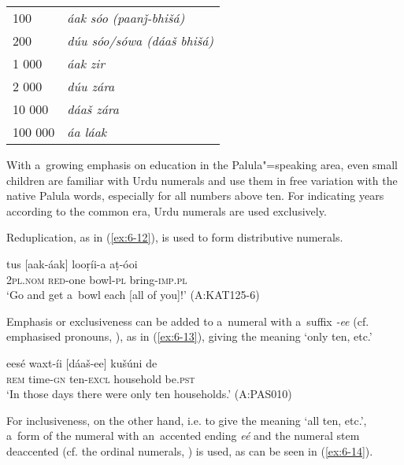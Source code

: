 \begin{table}[H]
\begin{tabularx}{\textwidth}{ l@{\hspace{40pt}} Q }
100 &
\sffamily \textrm{\textit{áak sóo (paanǰ-bhišá)}} \\
200 &
\sffamily \textrm{\textit{dúu sóo/sówa (dáaš bhišá)}}\\
1 000 &
\sffamily \textrm{\textit{áak zir}}\\
2 000 &
\sffamily \textrm{\textit{dúu zára}}\\
10 000 &
\sffamily \textrm{\textit{dáaš zára}}\\
100 000 &
\sffamily \textrm{\textit{áa láak}}\\
\end{tabularx}
\end{table}

With a~growing emphasis on education in the Palula"=speaking area, even small children are familiar
with Urdu numerals and use them in free variation with the native Palula words, especially for all
numbers above ten. For indicating years according to the common era, Urdu numerals are used
exclusively.

Reduplication, as in (\ref{ex:6-12}), is used to form distributive numerals.

\begin{exe}
\ex
\label{ex:6-12}
\gll tus [aak-áak] looṛíi-a aṭ-óoi \\
\textsc{2pl.nom} \textsc{red}-one bowl-\textsc{pl} bring-\textsc{imp.pl} \\
\glt `Go and get a~bowl each [all of you]!' (A:KAT125-6)
\end{exe}

Emphasis or exclusiveness can be added to a~numeral with a~suffix \textit{-ee} (cf. emphasised pronouns, ), as in (\ref{ex:6-13}), giving the meaning `only ten, etc.'

\begin{exe}
\ex
\label{ex:6-13}
\gll eesé waxt-íi [dáaš-ee] kušúni de \\
\textsc{rem} time-\textsc{gn} ten-\textsc{excl} household be.\textsc{pst} \\
\glt `In those days there were only ten households.' (A:PAS010)
\end{exe}

For inclusiveness, on the other hand, i.e. to give the meaning `all ten, etc.', a~form of the numeral with an~accented ending \textit{eé} and the numeral stem deaccented (cf. the ordinal numerals, ) is used, as can be seen in (\ref{ex:6-14}).


